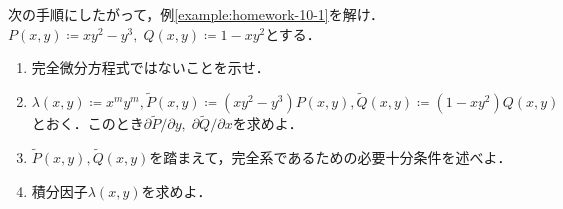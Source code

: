 \begin{homework*}
    次の手順にしたがって，例\ref{example:homework-10-1}を解け．$P(x,y) \coloneqq xy^2-y^3, \; Q(x,y) \coloneqq 1-xy^2$とする．
    \begin{enumerate}
        \item 完全微分方程式ではないことを示せ．
        \item $\lambda(x,y) \coloneqq x^my^m, \tilde{P}(x,y) \coloneqq (xy^2-y^3)P(x,y), \tilde{Q}(x,y) \coloneqq (1-xy^2)Q(x,y)$とおく．このとき$\partial \tilde{P}/\partial y, \; \partial \tilde{Q}/\partial x$を求めよ．
        \item $\tilde{P}(x,y),\tilde{Q}(x,y)$を踏まえて，完全系であるための必要十分条件を述べよ．
        \item 積分因子$\lambda(x,y)$を求めよ．
    \end{enumerate}
\end{homework*}


